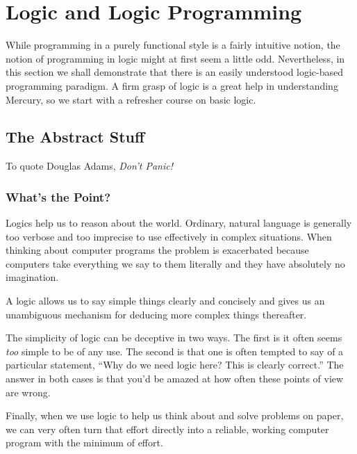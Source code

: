 
\chapter{Logic and Logic Programming}


While programming in a purely functional style is a fairly intuitive
notion, the notion of programming in logic might at first seem a little
odd.  Nevertheless, in this section we shall demonstrate that there is
an easily understood logic-based programming paradigm.  A firm grasp of
logic is a great help in understanding Mercury, so we start with a
refresher course on basic logic.

\section{The Abstract Stuff}

To quote Douglas Adams, \emph{Don't Panic!}

\subsection{What's the Point?}

Logics help us to reason about the world.  Ordinary, natural language is
generally too verbose and too imprecise to use effectively in complex
situations.  When thinking about computer programs the problem is
exacerbated because computers take everything we say to them literally
and they have absolutely no imagination.

A logic allows us to say simple things clearly and concisely and gives
us an unambiguous mechanism for deducing more complex things thereafter.

The simplicity of logic can be deceptive in two ways.  The first is it
often seems \emph{too} simple to be of any use.  The second is that one
is often tempted to say of a particular statement, ``Why do we need
logic here?  This is clearly correct.''  The answer in both cases is
that you'd be amazed at how often these points of view are wrong.

Finally, when we use logic to help us think about and solve problems on
paper, we can very often turn that effort directly into a reliable,
working computer program with the minimum of effort.

